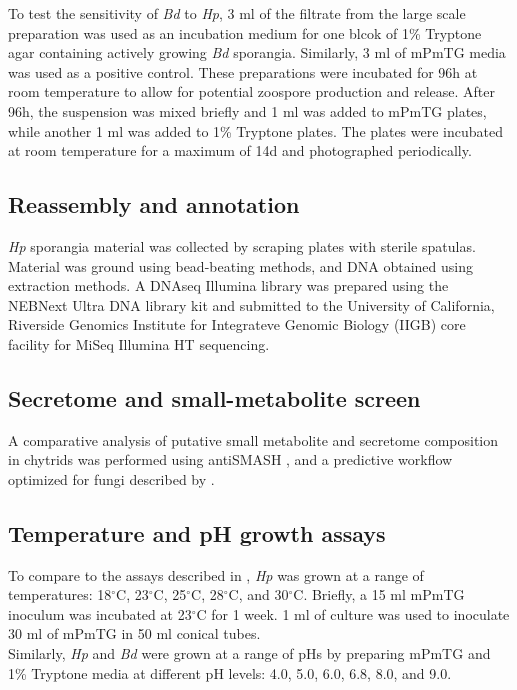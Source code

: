 \indent To test the sensitivity of \textit{Bd} to \textit{Hp}, 3 ml of the filtrate from the large scale preparation was used as an incubation medium for one blcok of 1\% Tryptone agar containing actively growing \textit{Bd} sporangia. Similarly, 3 ml of mPmTG media was used as a positive control. These preparations were incubated for 96h at room temperature to allow for potential zoospore production and release. After 96h, the suspension was mixed briefly and 1 ml was added to mPmTG plates, while another 1 ml was added to 1\% Tryptone plates. The plates were incubated at room temperature for a maximum of 14d and photographed periodically.\\
\subsection*{Reassembly and annotation}
\textit{Hp} sporangia material was collected by scraping plates with sterile spatulas. Material was ground using bead-beating methods, and DNA obtained using extraction methods. A DNAseq Illumina library was prepared using the NEBNext Ultra DNA library kit and submitted to the University of California, Riverside Genomics Institute for Integrateve Genomic Biology (IIGB) core facility for MiSeq Illumina HT sequencing.\\
\subsection*{Secretome and small-metabolite screen}
A comparative analysis of putative small metabolite and secretome composition in chytrids was performed using antiSMASH \cite{Blin2013}, and a predictive workflow optimized for fungi described by \cite{Min2010}.\\
\subsection*{Temperature and pH growth assays}
To compare to the assays described in \cite{Piotrowski2004}, \textit{Hp} was grown at a range of temperatures: 18$^{\circ}$C, 23$^{\circ}$C, 25$^{\circ}$C, 28$^{\circ}$C, and 30$^{\circ}$C. Briefly, a 15 ml mPmTG inoculum was incubated at 23$^{\circ}$C for 1 week. 1 ml of culture was used to inoculate 30 ml of mPmTG in 50 ml conical tubes. \\
\indent Similarly, \textit{Hp} and \textit{Bd} were grown at a range of pHs by preparing mPmTG and 1\% Tryptone media at different pH levels: 4.0, 5.0, 6.0, 6.8, 8.0, and 9.0.\\
